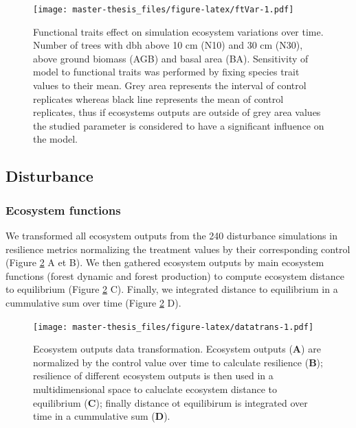 \documentclass[12pt,]{article}
\theoremstyle{definition}
\theoremstyle{definition}
\theoremstyle{remark}
\begin{document}
\begin{figure}[htbp]
\centering
\texttt{[image: master-thesis\_files/figure-latex/ftVar-1.pdf]}
\caption{\label{fig:ftVar}Functional traits effect on simulation ecosystem
variations over time. Number of trees with dbh above 10 cm (N10) and 30
cm (N30), above ground biomass (AGB) and basal area (BA). Sensitivity of
model to functional traits was performed by fixing species trait values
to their mean. Grey area represents the interval of control replicates
whereas black line represents the mean of control replicates, thus if
ecosystems outputs are outside of grey area values the studied parameter
is considered to have a significant influence on the model.}
\end{figure}

\subsection{Disturbance}\label{disturbance-1}

\subsubsection{Ecosystem functions}\label{ecosystem-functions-1}

We transformed all ecosystem outputs from the 240 disturbance
simulations in resilience metrics normalizing the treatment values by
their corresponding control (Figure \ref{fig:datatrans} A et B). We then
gathered ecosystem outputs by main ecosystem functions (forest dynamic
and forest production) to compute ecosystem distance to equilibrium
(Figure \ref{fig:datatrans} C). Finally, we integrated distance to
equilibrium in a cummulative sum over time (Figure \ref{fig:datatrans}
D).

\begin{figure}[htbp]
\centering
\texttt{[image: master-thesis\_files/figure-latex/datatrans-1.pdf]}
\caption{\label{fig:datatrans}Ecosystem outputs data transformation.
Ecosystem outputs (\textbf{A}) are normalized by the control value over
time to calculate resilience (\textbf{B}); resilience of different
ecosystem outputs is then used in a multidimensional space to caluclate
ecosystem distance to equilibrium (\textbf{C}); finally distance ot
equilibirum is integrated over time in a cummulative sum (\textbf{D}).}
\end{figure}
\end{document}
